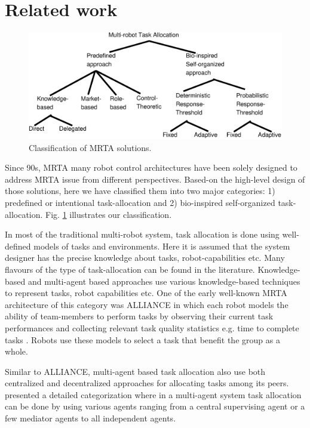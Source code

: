 \documentclass[preprint,12pt]{elsarticle}
\begin{document}
\section{Related work}
\label{sec:bg}
\begin{figure}
\centering
\includegraphics[width=12cm, angle=0]
{./images/ta-categories.eps}
\caption{\small Classification of MRTA solutions.}
\label{fig:mrta-classification} %
\end{figure}
Since 90s, MRTA many robot control architectures   have been solely designed to address MRTA issue from different perspectives. Based-on the high-level design of those solutions, here we have classified them into two major categories: 1) predefined or intentional task-allocation and 2) bio-inspired self-organized task-allocation. Fig. \ref{fig:mrta-classification} illustrates our classification.

In most of the traditional multi-robot system, task allocation is done using well-defined models of tasks and environments. Here it is assumed that the system designer has the precise knowledge about tasks, robot-capabilities etc. Many flavours of the type of task-allocation can be found in the literature. Knowledge-based and multi-agent based approaches use various knowledge-based techniques to represent tasks, robot capabilities etc. One of the early well-known MRTA architecture of this category was ALLIANCE  in which each robot models the ability of team-members to perform tasks by observing their current task performances and collecting relevant task quality statistics e.g. time to complete tasks \cite{Parker1998}. Robots use these models to select a task that benefit  the group as a whole. 

Similar to  ALLIANCE, multi-agent based task allocation also  use both centralized and decentralized approaches for allocating tasks among  its  peers. \citet{Shen+2001} presented a detailed categorization where in a multi-agent system task allocation can be done by using various agents ranging from a central supervising agent or a few mediator agents to  all independent agents. 
\end{document}
